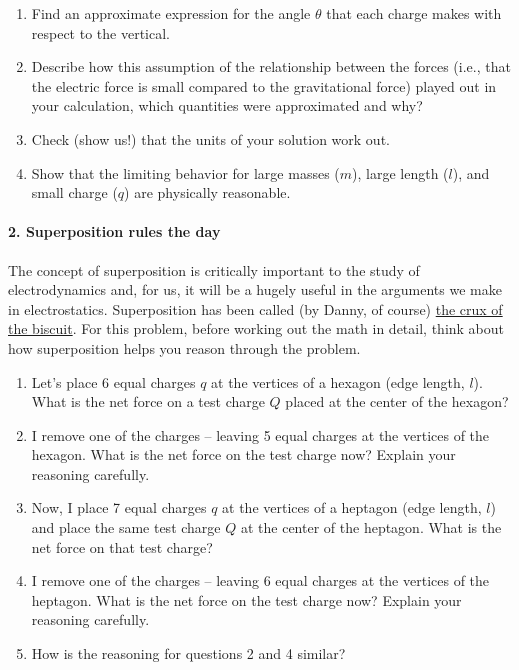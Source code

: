 \documentclass[11pt]{article}
\def\tightlist{}
\begin{document}
\begin{enumerate}
\def\labelenumi{\arabic{enumi}.}
\tightlist
\item
  Find an approximate expression for the angle \(\theta\) that each
  charge makes with respect to the vertical.
\item
  Describe how this assumption of the relationship between the forces
  (i.e., that the electric force is small compared to the gravitational
  force) played out in your calculation, which quantities were
  approximated and why?
\item
  Check (show us!) that the units of your solution work out.
\item
  Show that the limiting behavior for large masses (\(m\)), large length
  (\(l\)), and small charge (\(q\)) are physically reasonable.
\end{enumerate}

\paragraph{2. Superposition rules the
day}\label{superposition-rules-the-day}

The concept of superposition is critically important to the study of
electrodynamics and, for us, it will be a hugely useful in the arguments
we make in electrostatics. Superposition has been called (by Danny, of
course)
\href{https://www.youtube.com/playlist?list=PL8WvZFiJpAr3cZlCr0Gag8BV3-mGdcUBM}{the
crux of the biscuit}. For this problem, before working out the math in
detail, think about how superposition helps you reason through the
problem.

\begin{enumerate}
\def\labelenumi{\arabic{enumi}.}
\tightlist
\item
  Let's place 6 equal charges \(q\) at the vertices of a hexagon (edge
  length, \(l\)). What is the net force on a test charge \(Q\) placed at
  the center of the hexagon?
\item
  I remove one of the charges -- leaving 5 equal charges at the vertices
  of the hexagon. What is the net force on the test charge now? Explain
  your reasoning carefully.
\item
  Now, I place 7 equal charges \(q\) at the vertices of a heptagon (edge
  length, \(l\)) and place the same test charge \(Q\) at the center of
  the heptagon. What is the net force on that test charge?
\item
  I remove one of the charges -- leaving 6 equal charges at the vertices
  of the heptagon. What is the net force on the test charge now? Explain
  your reasoning carefully.
\item
  How is the reasoning for questions 2 and 4 similar?
\end{enumerate}
\end{document}
